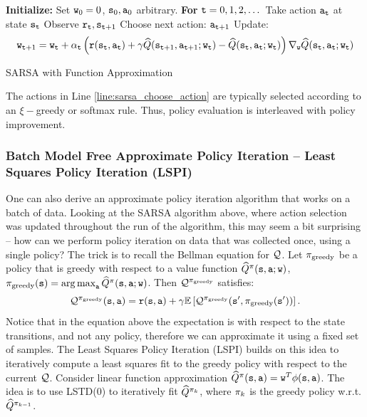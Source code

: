 \begin{algorithm}[H]
\begin{algorithmic}[1]
\State \textbf{Initialize:} Set ${\tt w}_0 = 0$, ${\tt s}_0, {\tt a}_0$ arbitrary.
\State \textbf{For} {${\tt t} = 0, 1, 2, \dots$}
    \State \quad Take action ${\tt a}_{\tt t}$ at state ${\tt s}_{\tt t}$
    \State \quad Observe ${\tt r}_{\tt t}, {\tt s}_{{\tt t}+1}$
    \State \quad \label{line:sarsa_choose_action}Choose next action: ${\tt a}_{{\tt t}+1}$ 
    \State \quad Update:
  \[
    {\tt w}_{{\tt t}+1} = {\tt w}_{\tt t} + \alpha_{\tt t} \left( {\tt r}({\tt s}_{\tt t},{\tt a}_{\tt t}) + \gamma \widehat{Q}({\tt s}_{{\tt t}+1},{\tt a}_{{\tt t}+1};{\tt w}_{\tt t}) - \widehat{Q}({\tt s}_{{\tt t}},{\tt a}_{{\tt t}}; {\tt w}_{\tt t}) \right) \nabla_{{\tt w}} \widehat{Q}({\tt s}_{\tt t},{\tt a}_{\tt t}; {\tt w}_{\tt t})\]
\end{algorithmic}
\caption{SARSA with Function Approximation}
\end{algorithm}


The actions in Line \ref{line:sarsa_choose_action} are typically selected according to an $\xi-$greedy or softmax rule. Thus, policy evaluation is interleaved with policy improvement.

\subsubsection{Batch Model Free Approximate Policy Iteration -- Least Squares Policy Iteration (LSPI)}
One can also derive an approximate policy iteration algorithm that works on a batch of data. Looking at the SARSA algorithm above, where action selection was updated throughout the run of the algorithm, this may seem a bit surprising -- how can we perform policy iteration on data that was collected once, using a single policy? The trick is to recall the Bellman equation for $\mathcal{Q}$. Let $\pi_{\textrm{greedy}}$ be a policy that is greedy with respect to a value function $\widehat{Q}^\pi({\tt s},{\tt a};{\tt w})$,  $\policy_{\textrm{greedy}}(\state) = \argmax_{\action}\widehat{Q}^\policy(\state,\action;\weight)$. Then $\mathcal{Q}^{\pi_{\textrm{greedy}}}$ satisfies:
\begin{equation*}
\mathcal{Q}^{\pi_{\textrm{greedy}}}({\tt s},{\tt a}) = {\tt r}({\tt s},{\tt a}) + \gamma \mathbb{E}\left[ \mathcal{Q}^{\pi_{\textrm{greedy}}}({\tt s}', \pi_{\textrm{greedy}}({\tt s}'))\right].
\end{equation*}
Notice that in the equation above the expectation is with respect to the state transitions, and not any policy, therefore we can approximate it using a fixed set of samples. The Least Squares Policy Iteration (LSPI) builds on this idea to iteratively compute a least squares fit to the greedy policy with respect to the current $\mathcal{Q}$.
Consider linear function approximation $\widehat{Q}^\pi({\tt s},{\tt a}) = {\tt w}^T \phi({\tt s},{\tt a})$. The idea is to use LSTD(0) to iteratively fit $\widehat{Q}^{\pi_k}$, where $\pi_k$ is the greedy policy w.r.t. $\widehat{Q}^{\pi_{k-1}}$.


